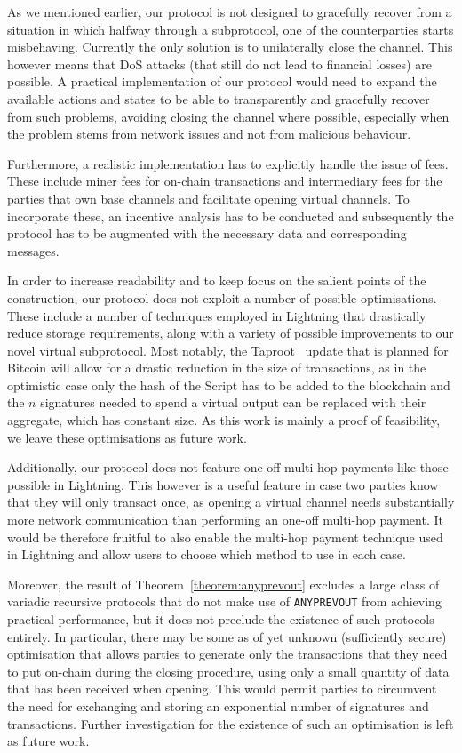   As we mentioned earlier, our protocol is not designed to gracefully recover
  from a situation in which halfway through a subprotocol, one of the
  counterparties starts misbehaving. Currently the only solution is to
  unilaterally close the channel. This however means that DoS attacks (that
  still do not lead to financial losses) are possible. A practical
  implementation of our protocol would need to expand the available actions and
  states to be able to transparently and gracefully recover from such problems,
  avoiding closing the channel where possible, especially when the problem stems
  from network issues and not from malicious behaviour.

  Furthermore, a realistic implementation has to explicitly handle the issue of
  fees. These include miner fees for on-chain transactions and intermediary fees
  for the parties that own base channels and facilitate opening virtual
  channels. To incorporate these, an incentive analysis has to be conducted and
  subsequently the protocol has to be augmented with the necessary data and
  corresponding messages.

  In order to increase readability and to keep focus on the salient points of
  the construction, our protocol does not exploit a number of possible
  optimisations. These include a number of techniques employed in Lightning that
  drastically reduce storage requirements, along with a variety of possible
  improvements to our novel virtual subprotocol. Most notably, the
  Taproot~\cite{taproot} update that is planned for Bitcoin will allow for a
  drastic reduction in the size of transactions, as in the optimistic case only
  the hash of the Script has to be added to the blockchain and the $n$
  signatures needed to spend a virtual output can be replaced with their
  aggregate, which has constant size. As this work is mainly a proof of
  feasibility, we leave these optimisations as future work.

  Additionally, our protocol does not feature one-off multi-hop payments like
  those possible in Lightning. This however is a useful feature in case two
  parties know that they will only transact once, as opening a virtual channel
  needs substantially more network communication than performing an one-off
  multi-hop payment. It would be therefore fruitful to also enable the multi-hop
  payment technique used in Lightning and allow users to choose which method to
  use in each case.

  Moreover, the result of Theorem~\ref{theorem:anyprevout} excludes a large
  class of variadic recursive protocols that do not make use of
  \texttt{ANYPREVOUT} from achieving practical performance, but it does not
  preclude the existence of such protocols entirely. In particular, there may be
  some as of yet unknown (sufficiently secure) optimisation that allows parties
  to generate only the transactions that they need to put on-chain during the
  closing procedure, using only a small quantity of data that has been received
  when opening. This would permit parties to circumvent the need for exchanging
  and storing an exponential number of signatures and transactions. Further
  investigation for the existence of such an optimisation is left as future
  work.

